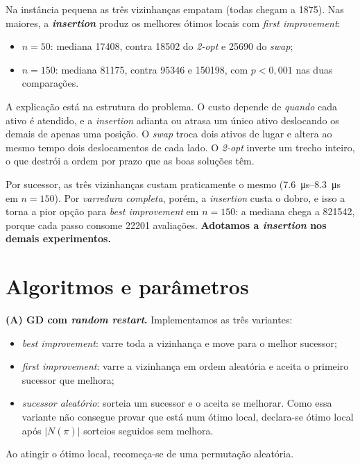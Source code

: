 Na instância pequena as três vizinhanças empatam (todas chegam a 1875). Nas
maiores, a \textbf{\textit{insertion}} produz os melhores ótimos locais com
\textit{first improvement}:
\begin{itemize}
    \item $n=50$: mediana \num{17408}, contra \num{18502} do \textit{2-opt} e
    \num{25690} do \textit{swap};
    \item $n=150$: mediana \num{81175}, contra \num{95346} e \num{150198}, com
    $p<0{,}001$ nas duas comparações.
\end{itemize}

A explicação está na estrutura do problema. O custo depende de \emph{quando}
cada ativo é atendido, e a \textit{insertion} adianta ou atrasa um único ativo
deslocando os demais de apenas uma posição. O \textit{swap} troca dois ativos
de lugar e altera ao mesmo tempo dois deslocamentos de cada lado. O
\textit{2-opt} inverte um trecho inteiro, o que destrói a ordem por prazo que
as boas soluções têm.

Por sucessor, as três vizinhanças custam praticamente o mesmo
(\SIrange{7,6}{8,3}{\micro\second} em $n=150$). Por \emph{varredura completa},
porém, a \textit{insertion} custa o dobro, e isso a torna a pior opção para
\textit{best improvement} em $n=150$: a mediana chega a \num{821542}, porque
cada passo consome \num{22201} avaliações. \textbf{Adotamos a
\textit{insertion} nos demais experimentos.}

\section{Algoritmos e parâmetros}

\textbf{(A) GD com \textit{random restart}.} Implementamos as três variantes:
\begin{itemize}
    \item \textit{best improvement}: varre toda a vizinhança e move para o
    melhor sucessor;
    \item \textit{first improvement}: varre a vizinhança em ordem aleatória e
    aceita o primeiro sucessor que melhora;
    \item \textit{sucessor aleatório}: sorteia um sucessor e o aceita se
    melhorar. Como essa variante não consegue provar que está num ótimo local,
    declara-se ótimo local após $|N(\pi)|$ sorteios seguidos sem melhora.
\end{itemize}
Ao atingir o ótimo local, recomeça-se de uma permutação aleatória.

